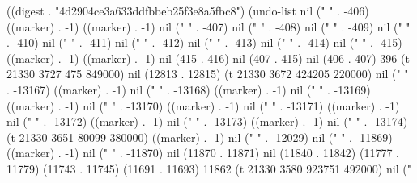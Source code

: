 
((digest . "4d2904ce3a633ddfbbeb25f3e8a5fbc8") (undo-list nil ("
" . -406) ((marker) . -1) ((marker) . -1) nil (" " . -407) nil (" " . -408) nil (" " . -409) nil (" " . -410) nil (" " . -411) nil (" " . -412) nil (" " . -413) nil (" " . -414) nil ("
" . -415) ((marker) . -1) ((marker) . -1) nil (415 . 416) nil (407 . 415) nil (406 . 407) 396 (t 21330 3727 475 849000) nil (12813 . 12815) (t 21330 3672 424205 220000) nil ("
" . -13167) ((marker) . -1) nil ("
" . -13168) ((marker) . -1) nil ("
" . -13169) ((marker) . -1) nil ("
" . -13170) ((marker) . -1) nil ("
" . -13171) ((marker) . -1) nil ("
" . -13172) ((marker) . -1) nil ("
" . -13173) ((marker) . -1) nil ("
" . -13174) (t 21330 3651 80099 380000) ((marker) . -1) nil ("%
" . -12029) nil ("
" . -11869) ((marker) . -1) nil (" " . -11870) nil (11870 . 11871) nil (11840 . 11842) (11777 . 11779) (11743 . 11745) (11691 . 11693) 11862 (t 21330 3580 923751 492000) nil ("%
